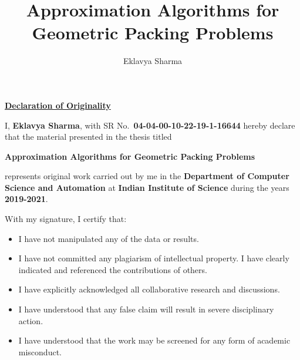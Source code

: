 
\newcommand*{\mytitle}{Approximation Algorithms for Geometric Packing Problems}
\newcommand*{\myname}{Eklavya Sharma}
\title{\mytitle}

\submitdate{\monthyeardate\today}
\mtechresearch
\author{\myname}


\maketitle



\begin{center}
\LARGE{\underline{\textbf{Declaration of Originality}}}
\end{center}
\noindent I, \textbf{Eklavya Sharma}, with SR No.~\textbf{04-04-00-10-22-19-1-16644}
hereby declare that the material presented in the thesis titled
\begin{center}
\textbf{\mytitle}
\end{center}
\noindent represents original work carried out by me in the
\textbf{Department of Computer Science and Automation}
at \textbf{Indian Institute of Science}
during the years \textbf{2019-2021}.

\noindent With my signature, I certify that:
\begin{itemize}
\item I have not manipulated any of the data or results.
\item I have not committed any plagiarism of intellectual property.
    I have clearly indicated and referenced the contributions of others.
\item I have explicitly acknowledged all collaborative research and discussions.
\item I have understood that any false claim will result in severe disciplinary action.
\item I have understood that the work may be screened for any form of academic misconduct.
\end{itemize}

